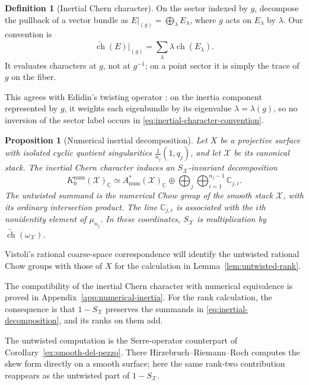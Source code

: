 \documentclass[11pt]{article}
\theoremstyle{plain}
\newtheorem{proposition}[theorem]{Proposition}
\theoremstyle{definition}
\newtheorem{definition}[theorem]{Definition}
\theoremstyle{remark}
\newcommand{\cX}{\mathcal X}
\newcommand{\C}{\mathbb C}
\newcommand{\1}{\mathbf 1}
\begin{document}
\begin{definition}[Inertial Chern character]
On the sector indexed by $g$, decompose the pullback of a vector bundle as $E|_{(g)}=\bigoplus_\lambda E_\lambda$, where $g$ acts on $E_\lambda$ by $\lambda$.  Our convention is
\begin{equation}\label{eq:inertial-character-convention}
\widetilde{\operatorname{ch}}(E)|_{(g)}
=\sum_\lambda\lambda\operatorname{ch}(E_\lambda).
\end{equation}
It evaluates characters at $g$, not at $g^{-1}$; on a point sector it is simply the trace of $g$ on the fiber.
\end{definition}
This agrees with Edidin's twisting operator \cite[Section 4.3.2]{Edidin}: on the inertia component represented by $g$, it weights each eigenbundle by its eigenvalue $\lambda=\lambda(g)$, so no inversion of the sector label occurs in \eqref{eq:inertial-character-convention}.

\begin{proposition}[Numerical inertial decomposition]\label{prop:numerical-inertia}
Let $X$ be a projective surface with isolated cyclic quotient singularities $\frac1{n_j}(1,q_j)$, and let $\cX$ be its canonical stack.  The inertial Chern character induces an $S_{\cX}$-invariant decomposition
\begin{equation}\label{eq:inertial-decomposition}
K_0^{\mathrm{num}}(\cX)_{\C}
\simeq A^*_{\mathrm{num}}(\cX)_{\C}
\oplus\bigoplus_j\bigoplus_{i=1}^{n_j-1}\C_{j,i}.
\end{equation}
The untwisted summand is the numerical Chow group of the smooth stack $\cX$, with its ordinary intersection product.  The line $\C_{j,i}$ is associated with the $i$th nonidentity element of $\mu_{n_j}$.  In these coordinates, $S_{\cX}$ is multiplication by $\widetilde{\operatorname{ch}}(\omega_{\cX})$.
\end{proposition}

Vistoli's rational coarse-space correspondence \cite[Proposition 6.1]{Vistoli} will identify the untwisted rational Chow groups with those of $X$ for the calculation in Lemma~\ref{lem:untwisted-rank}.

The compatibility of the inertial Chern character with numerical equivalence is proved in Appendix~\ref{app:numerical-inertia}.  For the rank calculation, the consequence is that $1-S_{\cX}$ preserves the summands in \eqref{eq:inertial-decomposition}, and its ranks on them add.

The untwisted computation is the Serre-operator counterpart of Corollary~\ref{ex:smooth-del-pezzo}.  There Hirzebruch--Riemann--Roch computes the skew form directly on a smooth surface; here the same rank-two contribution reappears as the untwisted part of $1-S_{\cX}$.
\end{document}
